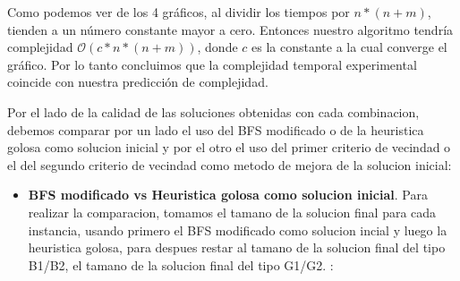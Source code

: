 Como podemos ver de los 4 gráficos, al dividir los tiempos por $n*(n+m)$, tienden a un número constante mayor a cero. Entonces nuestro algoritmo tendría complejidad $\mathcal{O}(c*n*(n+m))$, donde $c$ es la constante a la cual converge el gráfico. Por lo tanto concluimos que la complejidad temporal experimental coincide con nuestra predicción de complejidad.


Por el lado de la calidad de las soluciones obtenidas con cada combinacion, debemos comparar por un lado el uso del BFS modificado o de la heuristica golosa como solucion inicial y por el otro el uso del primer criterio de vecindad o el del segundo criterio de vecindad como metodo de mejora de la solucion inicial:
\begin{itemize}
\item \textbf{BFS modificado vs Heuristica golosa como solucion inicial}. Para realizar la comparacion, tomamos el tamano de la solucion final para cada instancia, usando primero el BFS modificado como solucion incial y luego la heuristica golosa, para despues restar al tamano de la solucion final del tipo B1/B2, el tamano de la solucion final del tipo G1/G2. :


\end{itemize}
